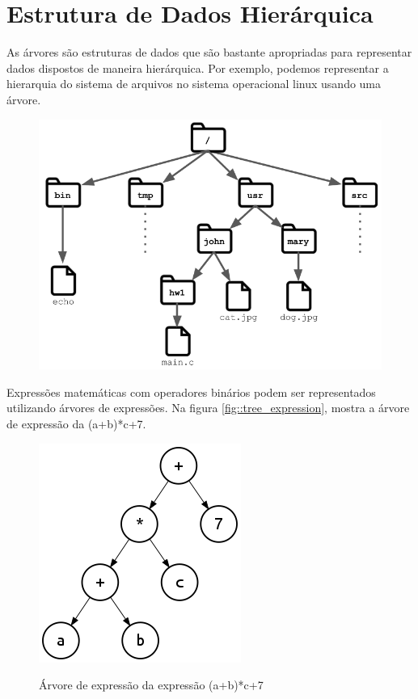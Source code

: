 \chapter{Estrutura de Dados Hierárquica }

As árvores são estruturas de dados que são bastante apropriadas para representar dados dispostos de maneira hierárquica. Por exemplo, podemos representar a hierarquia do sistema de arquivos no sistema operacional linux usando uma árvore.


\begin{figure}[htbp]
\centering
\includegraphics[width=.6\textwidth]{images/file_system.png}
\label{fig:exampleFig2}
\end{figure}

Expressões matemáticas com operadores binários podem ser representados utilizando árvores de expressões. Na figura \ref{fig::tree_expression}, mostra a árvore de expressão da (a+b)*c+7.

\begin{figure}[htbp]
\centering
\label{fig::tree_expression}
\includegraphics[scale=0.5]{images/250px-Exp-tree-ex-11.svg.png}
\label{fig:exampleFig2}
\caption{Árvore de expressão da expressão (a+b)*c+7}
\end{figure}

